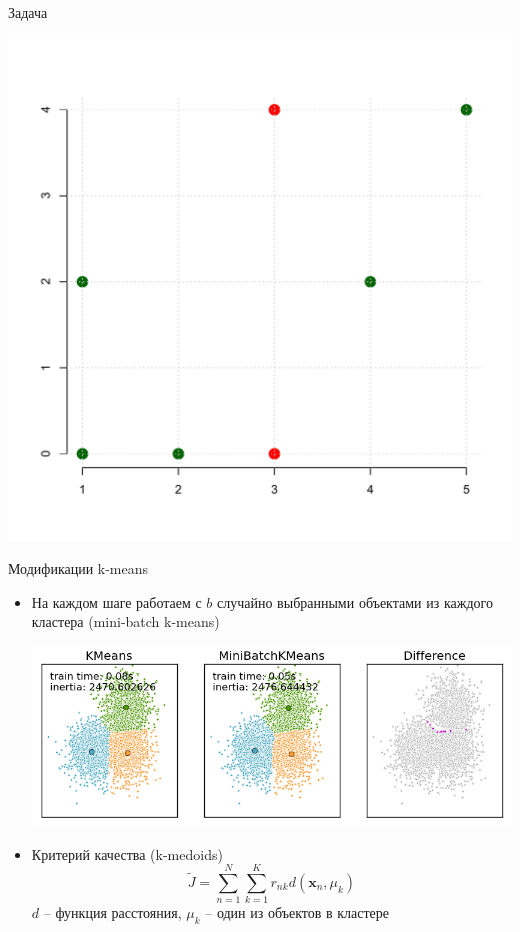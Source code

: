 \documentclass[10pt]{beamer}
\begin{document}
\begin{frame}{Задача}

\begin{center}
\includegraphics[height=0.9\textheight]{images/problem.pdf}
\end{center}

\end{frame}

\begin{frame}{Модификации k-means}

\begin{itemize}
\item На каждом шаге работаем с $b$ случайно выбранными объектами из каждого кластера (mini-batch k-means) \\
\begin{center}
\includegraphics[scale=0.35]{images/mbatch.png}
\end{center}
\item Критерий качества (k-medoids)
\[
\tilde J = \sum_{n=1}^N \sum_{k=1}^K r_{nk} d(\mathbf{x}_n, \mu_k)
\]
$d$ -- функция расстояния, $\mu_k$ -- один из объектов в кластере
\end{itemize}

\end{frame}
\end{document}

